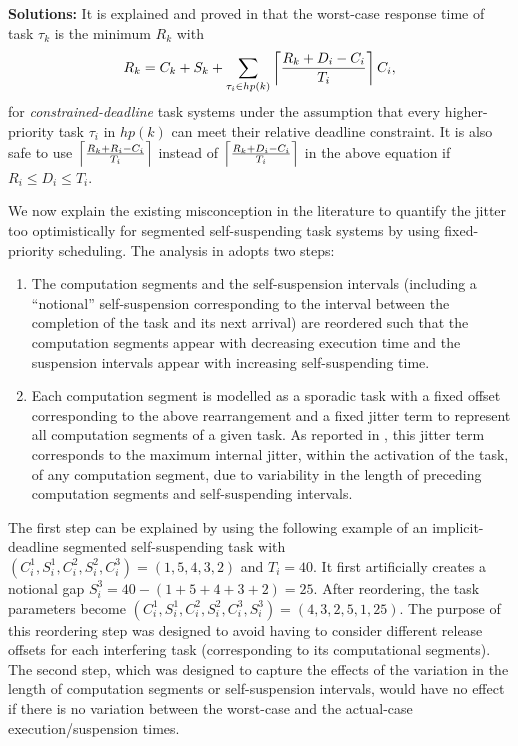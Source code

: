{\bf Solutions:} It is explained and proved in \cite{huangpass:dac2015,BletsasReport2015} that the worst-case response time of task $\tau_k$ is the minimum $R_k$ with
\begin{equation}
R_k = C_k+ S_k+\sum_{\tau_i \in hp(k)}\left\lceil{\frac{R_k+D_i-C_i}{T_i}}\right\rceil C_i,
\label{eq:dynamic-correct}
\end{equation}
for \emph{constrained-deadline} task systems under the assumption that every higher-priority task $\tau_i$ in $hp(k)$ can meet their relative deadline constraint. It is also safe to use $\left\lceil{\frac{R_k+R_i-C_i}{T_i}}\right\rceil$ instead of $\left\lceil{\frac{R_k+D_i-C_i}{T_i}}\right\rceil$ in the above equation if $R_i \leq D_i \leq T_i$.

\label{sec:wrong-jitter-segmented}


We now explain the existing misconception in the literature to quantify the jitter too optimistically for segmented self-suspending task systems by using fixed-priority scheduling.  The analysis in \cite{RTCSA-BletsasA05} adopts two steps: 
\begin{enumerate}
\item The computation segments and the self-suspension intervals (including a ``notional''
self-suspension corresponding to the interval between the completion of the task and its next arrival)
are reordered such that the computation segments appear with decreasing execution time and
the suspension intervals appear with increasing self-suspending time.
\item Each computation segment is modelled as a sporadic task with a fixed offset corresponding to the above
rearrangement and a fixed jitter term to represent all computation segments of a given task.
As reported in \cite{RTCSA-BletsasA05}, this jitter term corresponds to the maximum internal jitter, within the 
activation of the task, of any computation segment, due to variability in the length of 
preceding computation segments and self-suspending intervals.
\end{enumerate}
The first step can be explained by using the following example of an
implicit-deadline segmented self-suspending task with $(C_i^1, S_i^1, C_i^2, S_i^2, C_i^3) = (1, 5, 4, 3, 2)$ and $T_i=40$.  It first artificially creates a notional gap $S_i^3=40-(1+5+4+3+2)=25$. After reordering, the task parameters become $(C_i^1, S_i^1, C_i^2, S_i^2, C_i^3, S_i^3)  = (4, 3, 2, 5, 1, 25)$.  The purpose of this reordering step was designed to avoid having to consider different release offsets for each interfering task (corresponding to its computational segments). 
The second step, which was designed to capture the effects of the variation in the length of 
computation segments or self-suspension intervals, would have no effect if 
there is no variation between the worst-case and the actual-case execution/suspension times.



